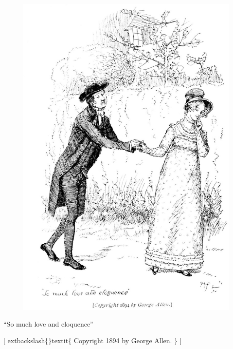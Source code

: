 \documentclass[10pt]{book}
\begin{document}
\begin{figure}[h]
\centering
\includegraphics[width=\linewidth]{images/i_185.jpg}
\end{figure}

      “So much love and eloquence”
     

     [
     	extbackslash\{\}textit\{
      Copyright 1894 by George Allen.
     \}
     ]
    
\end{document}
